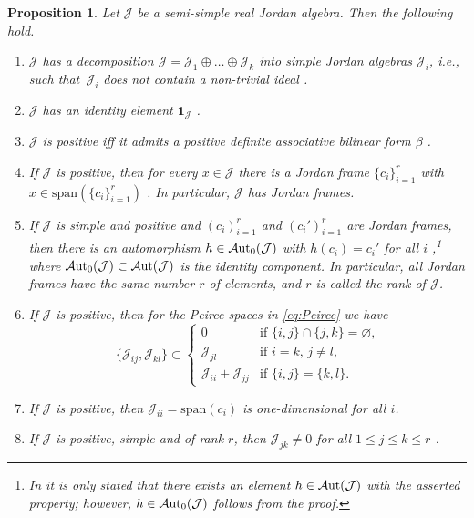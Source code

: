 \documentclass[10pt,a4paper]{amsart}
\numberwithin{equation}{section}
\newtheorem{Proposition}[Theorem]{Proposition}
 { \theoremstyle{definition}
\newtheorem{Definition}[Theorem]{Definition}
\newtheorem{Note}[Theorem]{Note}
\newtheorem{Example}[Theorem]{Example}
\newtheorem{Remark}[Theorem]{Remark} }
\newcommand{\Aut}{\mathcal{A}{\rm ut}}
\newcommand{\Jcal}{\mathcal{J}}
\newcommand{\sspan}{{\mathrm{span}}}
\begin{document}
\begin{Proposition} \label{prop:collect-positive-Jordan} Let $\Jcal$ be a semi-simple real Jordan algebra. Then the following hold.
\begin{enumerate}\itemsep=0pt
\item[$(1)$]%
$\Jcal$ has a decomposition $\Jcal = \Jcal_1 \oplus \dots \oplus \Jcal_k$ into {\em simple }Jordan algebras $\Jcal_i$, i.e., such that~$\Jcal_i$ does not contain a non-trivial ideal {\rm \cite[Theorem III.11]{Koecher-1999}}.
\item[$(2)$]
$\Jcal$ has an identity element $\mathbf{1}_\Jcal$ {\rm \cite[Theorem III.9]{Koecher-1999}}.%
\item[$(3)$] $\Jcal$ is positive iff it admits a positive definite associative bilinear form $\beta$ {\rm \cite[p.~61]{F-K-1994}}.%
\item[$(4)$]
If $\Jcal$ is positive, then for every $x \in \Jcal$ there is a Jordan frame $\{c_i\}_{i=1}^r$ with $x \in \sspan(\{c_i\}_{i=1}^r)$ {\rm \cite[Theorem III.1.2]{F-K-1994}}. In particular, $\Jcal$ has Jordan frames.%
\item[$(5)$]
If $\Jcal$ is simple and positive and $(c_i)_{i=1}^r$ and $(c_i')_{i=1}^r$ are Jordan frames, then there is an automorphism $h \in \Aut_0(\Jcal)$ with $h(c_i) = c_i'$ for all $i$ {\rm \cite[Theorem IV.2.5]{F-K-1994}},\footnote{In {\rm \cite{F-K-1994}} it is only stated that there exists an element $h \in \Aut(\Jcal)$ with the asserted property; however, $h \in \Aut_0(\Jcal)$ follows from the proof.} where $\Aut_0(\Jcal) \subset \Aut(\Jcal)$ is the identity component. In particular, all Jordan frames have the same number $r$ of elements, and $r$ is called the {\em rank of $\Jcal$}.%
\item[$(6)$]
If $\Jcal$ is positive, then for the Peirce spaces in \eqref{eq:Peirce} we have {\rm \cite[Theorem IV.2.1]{F-K-1994}}%
\[
\{\Jcal_{ij}, \Jcal_{kl}\} \subset \begin{cases} 0 & \text{if $\{i,j\} \cap \{j,k\} = \varnothing$,}\\
\Jcal_{jl} & \text{if $i=k$, $j \neq l$},\\
\Jcal_{ii} + \Jcal_{jj} & \text{if $\{i,j\} = \{k,l\}$}. \end{cases}
\]
\item[$(7)$]
If $\Jcal$ is positive, then $\Jcal_{ii} = \sspan(c_i)$ is one-dimensional for all $i$.%
\item[$(8)$]
{If $\Jcal$ is positive, simple and of rank $r$, then $\Jcal_{jk} \neq 0$ for all $1\leq j\leq k\leq r$ {\rm \cite[Theorem~IV.2.3]{F-K-1994}}.}%
\end{enumerate}
\end{Proposition}
\end{document}
